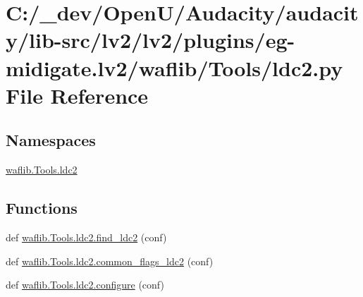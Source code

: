 \hypertarget{lv2_2plugins_2eg-midigate_8lv2_2waflib_2_tools_2ldc2_8py}{}\section{C\+:/\+\_\+dev/\+Open\+U/\+Audacity/audacity/lib-\/src/lv2/lv2/plugins/eg-\/midigate.lv2/waflib/\+Tools/ldc2.py File Reference}
\label{lv2_2plugins_2eg-midigate_8lv2_2waflib_2_tools_2ldc2_8py}
\subsection*{Namespaces}
\begin{DoxyCompactItemize}
\item 
 \hyperlink{namespacewaflib_1_1_tools_1_1ldc2}{waflib.\+Tools.\+ldc2}
\end{DoxyCompactItemize}
\subsection*{Functions}
\begin{DoxyCompactItemize}
\item 
def \hyperlink{namespacewaflib_1_1_tools_1_1ldc2_a73aa41d45a6712decaf40b6bc5d35ee5}{waflib.\+Tools.\+ldc2.\+find\+\_\+ldc2} (conf)
\item 
def \hyperlink{namespacewaflib_1_1_tools_1_1ldc2_a183e4e7be481c7c81988655ddc0346d6}{waflib.\+Tools.\+ldc2.\+common\+\_\+flags\+\_\+ldc2} (conf)
\item 
def \hyperlink{namespacewaflib_1_1_tools_1_1ldc2_a930f6047abb96feb45e7391418e486ec}{waflib.\+Tools.\+ldc2.\+configure} (conf)
\end{DoxyCompactItemize}
